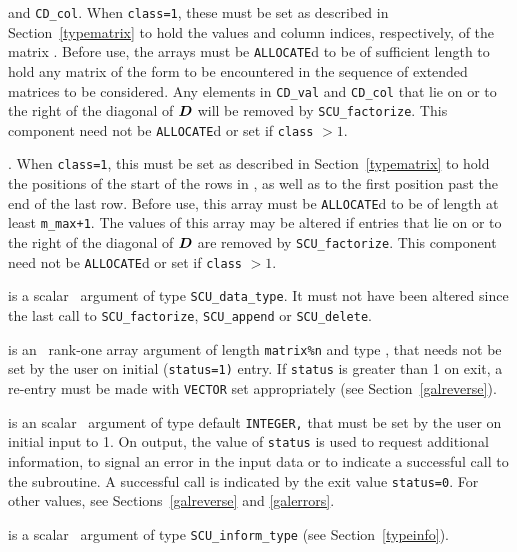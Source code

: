 \documentclass{galahad}
\newcommand{\packagename}{SCU}
\begin{document}
\begin{description}
\begin{description}
 and {\tt CD\_col}.   
When {\tt class=1}, 
these must be set as described in Section~\ref{typematrix} to hold the 
values and column indices, respectively, of the matrix .  
Before use, the arrays must be {\tt ALLOCATE}d 
to be of sufficient length to hold any matrix of the form  
to be encountered in the sequence of 
extended matrices to be considered. Any elements in 
{\tt CD\_val} and {\tt CD\_col} 
that lie on or to the right of the diagonal of ${\bm{D}}$ will be removed by  
{\tt \packagename\_factorize}. 
This component need not be {\tt ALLOCATE}d or set if {\tt class} $> 1$. 
 
. When {\tt class=1}, 
this must be set as described in Section~\ref{typematrix} to hold the 
positions of the start of the rows in , as well as to the first 
position past the end of the last row. 
Before use, this array must be {\tt ALLOCATE}d to be of length at least 
{\tt m\_max+1}. 
The values of this array may be altered if entries that lie on or to the 
right of the diagonal of ${\bm{D}}$ are removed by {\tt \packagename\_factorize}. 
This component need not be {\tt ALLOCATE}d or set if {\tt class} $> 1$. 
 
\end{description} 
 
 is a scalar \intentinout\ argument of type 
{\tt \packagename\_data\_type}. 
It must not have been altered since the last call to  
{\tt \packagename\_factorize}, 
{\tt \packagename\_append} or 
{\tt \packagename\_delete}. 
 
 is an \intentinout\ rank-one array argument of length 
{\tt matrix\%n} 
and type \realdp, 
that needs not be set by 
the user on initial ({\tt status=1)} entry. If {\tt status} is greater than 
1 on exit, a re-entry must be made with {\tt VECTOR} set appropriately 
(see Section~\ref{galreverse}). 
 
 is an scalar \intentinout\ argument of type 
default {\tt INTEGER,} that  
must be set by the user on initial input to 1. On output, the value of 
{\tt status} 
is used to request additional information, to signal an error 
in the input data or to indicate a successful call to the subroutine. 
A successful call is indicated by the exit value {\tt status=0}. 
For other values, see Sections~\ref{galreverse} and \ref{galerrors}. 
 
 is a scalar \intentinout\ argument of type 
{\tt \packagename\_inform\_type} 
(see Section~\ref{typeinfo}). 
 
\end{description}
\end{document}
